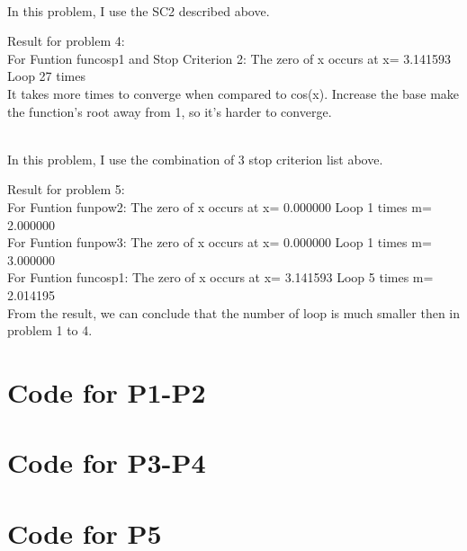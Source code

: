 \documentclass[12pt]{article}
\newenvironment{problem}[2][Problem]{\begin{trivlist}
\item[\hskip \labelsep {\bfseries #1}\hskip \labelsep {\bfseries #2.}]}{\end{trivlist}}
\begin{document}
\begin{problem}{4}
\text{ }\\
In this problem, I use the SC2 described above.
\item Result for problem 4:\\
For Funtion funcosp1 and Stop Criterion 2:	 The zero of x occurs at x= 3.141593 	Loop 27 times\\
It takes more times to converge when compared to cos(x). Increase the base make the function's root away from 1, so it's harder to converge.
\end{problem}
 
\begin{problem}{5}
\text{ }\\
In this problem, I use the combination of 3 stop criterion list above.
\item Result for problem 5:\\
For Funtion funpow2:	 The zero of x occurs at x= 0.000000 	Loop 1 times 	 m= 2.000000\\
For Funtion funpow3:	 The zero of x occurs at x= 0.000000 	Loop 1 times 	 m= 3.000000\\
For Funtion funcosp1:	 The zero of x occurs at x= 3.141593 	Loop 5 times 	 m= 2.014195\\
From the result, we can conclude that the number of loop is much smaller then in problem 1 to 4.
\end{problem}

\begin{appendices}  

\section{Code for P1-P2}  
  
\section{Code for P3-P4}  

\section{Code for P5}  

\end{appendices}  
\end{document}
